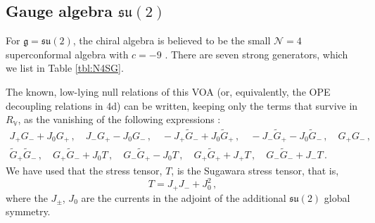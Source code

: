 \documentclass[12pt]{article}
\numberwithin{equation}{section}
\numberwithin{figure}{section}
\theoremstyle{plain}
\theoremstyle{definition}
\begin{document}
\subsection{Gauge algebra \texorpdfstring{$\mathfrak{su}(2)$}{su(2)}}\label{sec:N4su2}

For $\mathfrak{g} = \mathfrak{su}(2)$, the chiral algebra is believed to be the small $\mathcal{N}=4$ superconformal algebra with $c = -9$ \cite{Beem:2013sza}. There are seven strong generators, which we list in Table \ref{tbl:N4SG}.

The known, low-lying null relations of this VOA (or, equivalently, the OPE decoupling relations in 4d) can be written, keeping only the terms that survive in $R_{\mathbb{V}}$, as the vanishing of the following expressions \cite{MR3492038,Bonetti:2025kan}:
\begin{equation}\label{eqn:N4nulls}
\begin{gathered}
    J_+ G_- + J_0 G_+ \,, \quad J_- G_+ - J_0 G_- \,, \quad 
    -J_+ \widetilde{G}_- + J_0 \widetilde{G}_+ \,, \quad - J_- \widetilde{G}_+ - J_0 \widetilde{G}_- \,, \quad G_+ G_- \,, \\ \widetilde{G}_+ \widetilde{G}_- \,, \quad 
    G_+ \widetilde{G}_- + J_0 T \,, \quad G_- \widetilde{G}_+ - J_0 T \,, \quad 
    G_+ \widetilde{G}_+ + J_+ T \,, \quad G_- \widetilde{G}_- + J_- T \,.
\end{gathered}
\end{equation}
We have used that the stress tensor, $T$, is the Sugawara stress tensor, that is,
\begin{equation}\label{eqn:N4sugawara}
    T = J_+ J_- + J_0^2 \,,
\end{equation}
where the $J_{\pm}$, $J_0$ are the currents in the adjoint of the additional $\mathfrak{su}(2)$ global symmetry.
\end{document}

